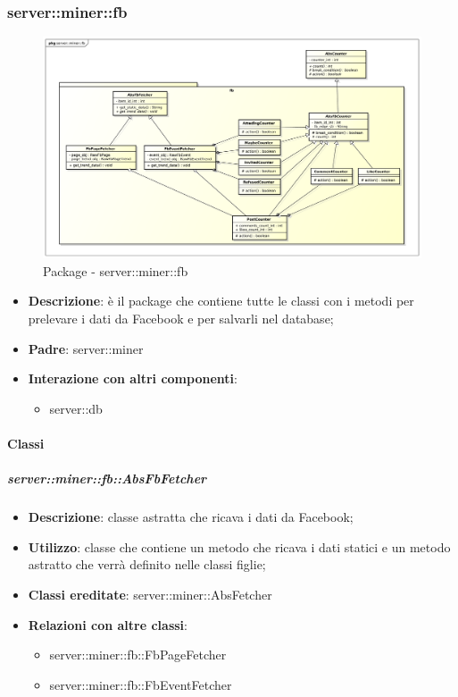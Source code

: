 \subsubsection{server::miner::fb} %
\label{ssub:bdsm_app_server_miner_fb}
\begin{figure}[htbp]
	\centering
	\centerline{\includegraphics[scale=0.3]{./images/server/miner_fb.pdf}}
	\caption{Package - server::miner::fb}
\end{figure}

\begin{itemize}
  \item \textbf{Descrizione}: è il package che contiene tutte le classi con i metodi per prelevare i dati da Facebook e per salvarli nel database;
  \item \textbf{Padre}: server::miner
  \item \textbf{Interazione con altri componenti}:
  	\begin{itemize}
  		\item server::db
  	\end{itemize}
\end{itemize}

	\paragraph{Classi} %
		\subparagraph{server::miner::fb::AbsFbFetcher} %
		\label{subp:server_miner_fb_AbsFbFetcher}
			\begin{itemize}
				\item \textbf{Descrizione}: classe astratta che ricava i dati da Facebook;
				\item \textbf{Utilizzo}: classe che contiene un metodo che ricava i dati statici e un metodo astratto che verrà definito nelle classi figlie;
				\item \textbf{Classi ereditate}: server::miner::AbsFetcher
				\item \textbf{Relazioni con altre classi}:
					\begin{itemize}
						\item server::miner::fb::FbPageFetcher
						\item server::miner::fb::FbEventFetcher
					\end{itemize}
			\end{itemize}

